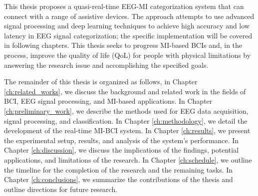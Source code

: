 This thesis proposes a quasi-real-time EEG-MI categorization system that can connect with a range of assistive devices.
The approach attempts to use advanced signal processing and deep learning techniques to achieve high accuracy and low latency in EEG signal categorization; the specific implementation will be covered in following chapters.
This thesis seeks to progress MI-based BCIs and, in the process, improve the quality of life (QoL) for people with physical limitations by answering the research issue and accomplishing the specified goals.


The remainder of this thesis is organized as follows, in Chapter \ref{ch:related_works}, we discuss the background and related work in the fields of BCI, EEG signal processing, and MI-based applications.
In Chapter \ref{ch:preliminary_work}, we describe the methods used for EEG data acquisition, signal processing, and classification.
In Chapter \ref{ch:methodology}, we detail the development of the real-time MI-BCI system.
In Chapter \ref{ch:results}, we present the experimental setup, results, and analysis of the system's performance.
In Chapter \ref{ch:discussion}, we discuss the implications of the findings, potential applications, and limitations of the research.
In Chapter \ref{ch:schedule}, we outline the timeline for the completion of the research and the remaining tasks.
In Chapter \ref{ch:conclusions}, we summarize the contributions of the thesis and outline directions for future research.
